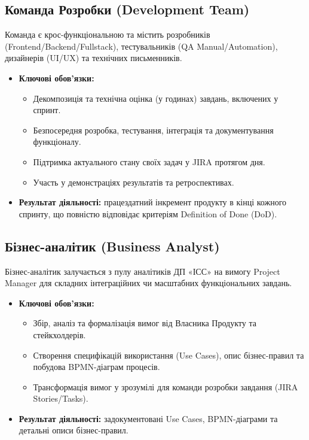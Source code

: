 \documentclass{article}
\begin{document}
\subsection{Команда Розробки (Development Team)}
Команда є крос-функціональною та містить розробників (Frontend/Backend/Fullstack), тестувальників (QA Manual/Automation), дизайнерів (UI/UX) та технічних письменників.
\begin{itemize}
    \item \textbf{Ключові обов'язки:}
    \begin{itemize}
        \item Декомпозиція та технічна оцінка (у годинах) завдань, включених у спринт.
        \item Безпосередня розробка, тестування, інтеграція та документування функціоналу.
        \item Підтримка актуального стану своїх задач у JIRA протягом дня.
        \item Участь у демонстраціях результатів та ретроспективах.
    \end{itemize}
    \item \textbf{Результат діяльності:} працездатний інкремент продукту в кінці кожного спринту, що повністю відповідає критеріям Definition of Done (DoD).
\end{itemize}

\subsection{Бізнес-аналітик (Business Analyst)}
Бізнес-аналітик залучається з пулу аналітиків ДП «ІСС» на вимогу Project Manager для складних інтеграційних чи масштабних функціональних завдань.
\begin{itemize}
    \item \textbf{Ключові обов'язки:}
    \begin{itemize}
        \item Збір, аналіз та формалізація вимог від Власника Продукту та стейкхолдерів.
        \item Створення специфікацій використання (Use Cases), опис бізнес-правил та побудова BPMN-діаграм процесів.
        \item Трансформація вимог у зрозумілі для команди розробки завдання (JIRA Stories/Tasks).
    \end{itemize}
    \item \textbf{Результат діяльності:} задокументовані Use Cases, BPMN-діаграми та детальні описи бізнес-правил.
\end{itemize}
\end{document}

